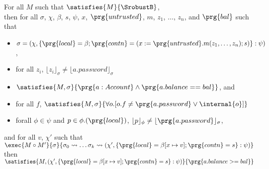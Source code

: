 \begin{lemma}
For all $M$ such that $\satisfies{M}{{\SrobustB}}$,\\
then for all $\sigma$, $\chi$, $\beta$, $s$, $\psi$, $x$, $\prg{untrusted}$, $m$, $z_1$, $\ldots$, $z_n$, and $\prg{bal}$ such that
\begin{itemize} 
\item
$\sigma = (\chi, \{\prg{local} = \beta; \prg{contn} = (x := \prg{untrusted}.m(z_1, \ldots, z_n); s)\} : \psi)$,
\item
for all $z_i$, $\lfloor z_i \rfloor_\sigma \neq \lfloor a.password \rfloor_\sigma$
\item
$\satisfies{M, \sigma}{\prg{a : Account} \wedge \prg{a.balance == bal}}$, and
\item
for all $f$, $\satisfies{M, \sigma}{\forall o.[o.f \neq \prg{a.password} \vee \internal{o}]}$
\item
forall $\phi \in \psi$ and $p \in \phi.(\prg{local})$, $\lfloor p \rfloor_\phi \neq \lfloor \prg{a.password} \rfloor_\sigma$, 
\end{itemize}
and for all $v$, $\chi'$ such that $\exec{M \circ M'}{\sigma}{\sigma_0 \leadsto \ldots \sigma_k \leadsto (\chi', \{\prg{local} = \beta[x \mapsto v]; \prg{contn} = s\} : \psi)}$\\
then $\satisfies{M, (\chi', \{\prg{local} = \beta[x \mapsto v]; \prg{contn} = s\} : \psi)}{\prg{a.balance >= bal}}$
\end{lemma}
